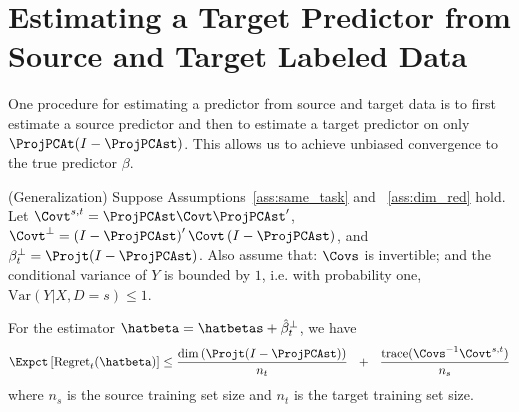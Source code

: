 \section{Estimating a Target Predictor from Source and Target Labeled Data}

One procedure for estimating a predictor from source and target data
is to first estimate a source predictor and then to estimate a target
predictor on only $\ProjPCAt(I - \ProjPCAst)$.  This allows us to
achieve unbiased convergence to the true predictor $\beta$.

\begin{theorem}\label{thm:generalization} (Generalization)
Suppose Assumptions~\ref{ass:same_task} and ~\ref{ass:dim_red}
hold. Let $\Covt^{s,t} = \ProjPCAst\Covt\ProjPCAst'$, $\Covt^{\bot} =
\left(I - \ProjPCAst\right)'\Covt\left(I - \ProjPCAst\right)$, and
$\beta^{\bot}_{t} = \Projt(I - \ProjPCAst)$.  Also assume that:
$\Covs$ is invertible; and the conditional variance of $Y$ is bounded
by $1$, i.e. with probability one, $\mathrm{Var}(Y|X, D=s) \leq 1$.

For the estimator $\hatbeta = \hatbetas + \hat{\beta}^{\bot}_{t}$, we have
\[
\Expct\left[\mathrm{Regret}_t(\hatbeta)\right]
\leq \frac{\mathrm{dim}\left(\Projt(I-\ProjPCAst)\right)}{n_{t}}
~~+~~ \frac{\mathrm{trace}(\Covs^{-1}\Covt^{s,t})}{n_{s}}
\]
where $n_{s}$ is the source training set size and $n_{t}$ is the target
training set size.
\end{theorem} 
